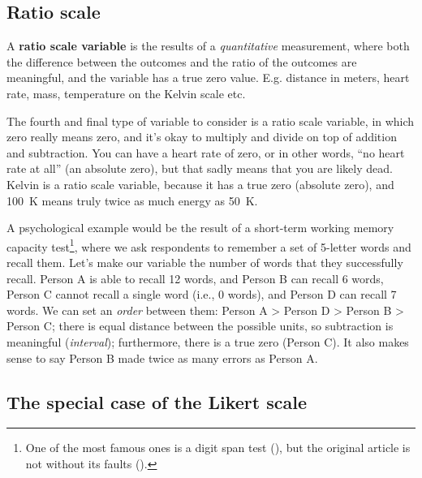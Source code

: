 \documentclass[
  11pt,
  a4paper,
  twoside,symmetric,openright]{book}
\theoremstyle{break}
\theoremstyle{break}
\begin{document}
\subsection{Ratio scale}\label{ratioscale}

\begin{definition}
\protect\hypertarget{def:defratio}{}\label{def:defratio}A \textbf{ratio scale variable} is the results of a \emph{quantitative} measurement, where both the difference between the outcomes and the ratio of the outcomes are meaningful, and the variable has a true zero value. E.g. distance in meters, heart rate, mass, temperature on the Kelvin scale etc.
\end{definition}

The fourth and final type of variable to consider is a ratio scale variable, in which zero really means zero, and it's okay to multiply and divide on top of addition and subtraction. You can have a heart rate of zero, or in other words, ``no heart rate at all'' (an absolute zero), but that sadly means that you are likely dead. Kelvin is a ratio scale variable, because it has a true zero (absolute zero), and 100~K means truly twice as much energy as 50~K.

\begin{example}
\protect\hypertarget{exm:exratio}{}\label{exm:exratio}A psychological example would be the result of a short-term working memory capacity test\footnote{One of the most famous ones is a digit span test (), but the original article is not without its faults ().}, where we ask respondents to remember a set of 5-letter words and recall them. Let's make our variable the number of words that they successfully recall. Person A is able to recall 12 words, and Person B can recall 6 words, Person C cannot recall a single word (i.e., 0 words), and Person D can recall 7 words. We can set an \emph{order} between them: Person A \textgreater{} Person D \textgreater{} Person B \textgreater{} Person C; there is equal distance between the possible units, so subtraction is meaningful (\emph{interval}); furthermore, there is a true zero (Person C). It also makes sense to say Person B made twice as many errors as Person A.
\end{example}

\subsection{The special case of the Likert scale}\label{likertscale}
\end{document}
